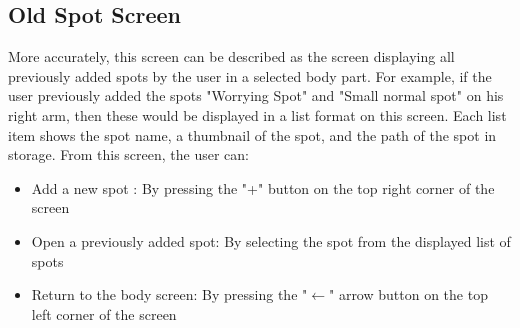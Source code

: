 \subsection{Old Spot Screen} \label{sec:oldspotscreen}
More accurately, this screen can be described as the screen displaying all previously added spots by the user in a selected body part. For example, if the user previously added the spots "Worrying Spot" and "Small normal spot" on his right arm, then these would be displayed in a list format on this screen. Each list item shows the spot name, a thumbnail of the spot, and the path of the spot in storage. From this screen, the user can:
\begin{itemize}
\item Add a new spot : By pressing the "+" button on the top right corner of the screen
\item Open a previously added spot: By selecting the spot from the displayed list of spots
\item Return to the body screen: By pressing the "$\leftarrow$" arrow button on the top left corner of the screen
\end{itemize}

